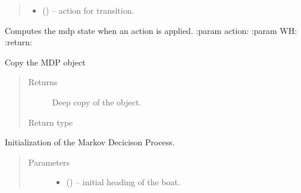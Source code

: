 \documentclass[letterpaper,10pt,english]{sphinxmanual}
\begin{document}
\begin{fulllineitems}
\begin{quote}
\begin{description}
\begin{itemize}
\item {} 
 () -- action for transition.

\end{itemize}

\end{description}\end{quote}

\begin{fulllineitems}
\label{\detokenize{package1:mdp.MDP.computeState}}
Computes the mdp state when an action is applied.
:param action:
:param WH:
:return:

\end{fulllineitems}


\begin{fulllineitems}
\label{\detokenize{package1:mdp.MDP.copy}}
Copy the MDP object
\begin{quote}\begin{description}
\item[{Returns}] \leavevmode
Deep copy of the object.

\item[{Return type}] \leavevmode
{\hyperref[\detokenize{package1:mdp.MDP}]{}}

\end{description}\end{quote}

\end{fulllineitems}


\begin{fulllineitems}
\label{\detokenize{package1:mdp.MDP.extractSimulationData}}
\end{fulllineitems}


\begin{fulllineitems}
\label{\detokenize{package1:mdp.MDP.initializeMDP}}
Initialization of the Markov Decicison Process.
\begin{quote}\begin{description}
\item[{Parameters}] \leavevmode\begin{itemize}
\item {} 
 () -- initial heading of the boat.


\end{itemize}
\end{description}
\end{quote}
\end{fulllineitems}
\end{fulllineitems}
\end{document}
